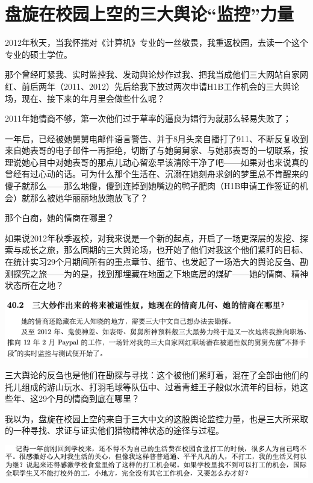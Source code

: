 \documentclass[9pt, b5paper]{article}
\begin{document}
\section{盘旋在校园上空的三大舆论“监控”力量}
\label{sec:org640904e}

2012年秋天，当我怀揣对《计算机》专业的一丝敬畏，我重返校园，去读一个这个专业的硕士学位。

那个曾经盯紧我、实时监控我、发动舆论炒作过我、把我当成他们三大网站自家网红、前后两年（2011、2012）先后给我下放过两次申请H1B工作机会的三大舆论场，现在、接下来的年月里会做些什么呢？

2011年她情商不够，第一次他们过于草率的逼良为娼行为就那么轻易失败了；

一年后，已经被她舅舅电邮件语言警告、并于8月头亲自播打了911、不断反复收到来自她表哥的电子邮件一再拒绝，切断了与她舅舅家、与她那表哥的一切联系，按理说她心目中对她表哥的那点儿动心留恋早该清除干净了吧——如果对也来说真的曾经有过心动的话。可为什么那个生活在、沉溺在她刻舟求剑的梦里总不肯醒来的傻子就那么——那么地傻，傻到连掉到她嘴边的鸭子肥肉（H1B申请工作签证的机会）就那么被她华丽丽地放跑放飞了？

那个白痴，她的情商在哪里？

如果说2012年秋季返校，对我来说是一个新的起点，开启了一场更深层的发挖、探索与成长之旅，那么同期的三大舆论场，也开始了他们对我这个他们紧盯的目标、在统计实习29个月期间所有的重点章节、细节、也发起了一场浩大的舆论反刍、勘测探究之旅——为的是，找到那埋藏在地面之下地底层的煤矿——她的情商、精神状态所在之地？

\begin{center}
\includegraphics[width=.9\linewidth]{./pic/backups_plans_20210424_101221.png}
\end{center}

三大舆论的反刍也是他们在勘探与寻找：这个被他们紧盯着，混在了全部由他们的托儿组成的游山玩水、打羽毛球等队伍中、过着青蛙王子般似水流年的目标，她这些年、这29个月的情商到底在哪里？

我以为，盘旋在校园上空的来自于三大中文的这股舆论监控力量，也是三大所采取的一种寻找、求证与证实他们猎物精神状态的途径与过程。


\begin{center}
\includegraphics[width=.9\linewidth]{./pic/backups_plans_20210424_220444.png}
\end{center}
\end{document}
